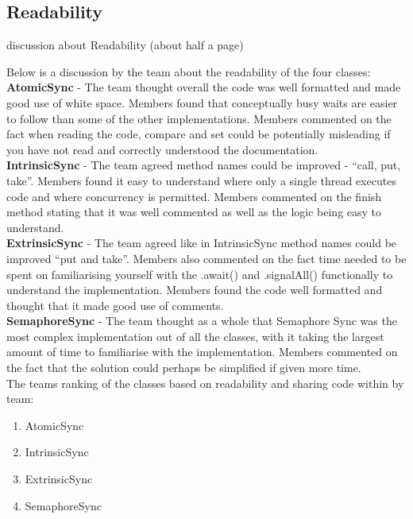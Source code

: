 \documentclass[11pt]{article}
\begin{document}
\pagebreak
\subsection{Readability}
discussion about  Readability (about half a page)

Below is a discussion by the team about the readability of the four classes: \\

\textbf{AtomicSync} - The team thought overall the code was well formatted and made good use of white space. Members found that conceptually busy waits are easier to follow than some of the other implementations. Members commented on the fact when reading the code, compare and set could be potentially misleading if you have not read and correctly understood the documentation.\\

\textbf{IntrinsicSync} - The team agreed method names could be improved - “call, put, take”. Members found it easy to understand where only a single thread executes code and where concurrency is permitted. Members commented on the finish method stating that it was well commented as well as the logic being easy to understand. \\

\textbf{ExtrinsicSync} - The team agreed like in IntrinsicSync method names could be improved “put and take”. Members also commented on the fact time needed to be spent on familiarising yourself with the .await() and .signalAll() functionally to understand the implementation. Members found the code well formatted and thought that it made good use of comments. \\

\textbf{SemaphoreSync} - The team thought as a whole that Semaphore Sync was the most complex implementation out of all the classes, with it taking the largest amount of time to familiarise with the implementation. Members commented on the fact that the solution could perhaps be simplified if given more time.  \\

The teams ranking of the classes based on readability and sharing code within by team: 

\begin{enumerate}
	\item AtomicSync
	\item IntrinsicSync
	\item ExtrinsicSync
	\item SemaphoreSync
\end{enumerate}
\end{document}
